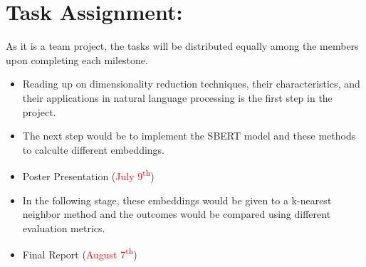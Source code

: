 \documentclass{article}
\begin{document}
\section{Task Assignment:}
As it is a team project, the tasks will be distributed equally among the members upon completing each milestone. 
\begin{itemize}

\item Reading up on dimensionality reduction techniques, their characteristics, and their applications in natural language processing is the first step in the project. 

\item The next step would be to implement the SBERT model and these methods to calculte different embeddings. 

\item Poster Presentation (\textcolor{red}{July 9\textsuperscript{th}})

\item In the following stage, these embeddings would be given to a k-nearest neighbor method and the outcomes would be compared using different evaluation metrics. 

\item Final Report (\textcolor{red}{August 7\textsuperscript{th}})

\end{itemize}
\newpage


\end{document}
